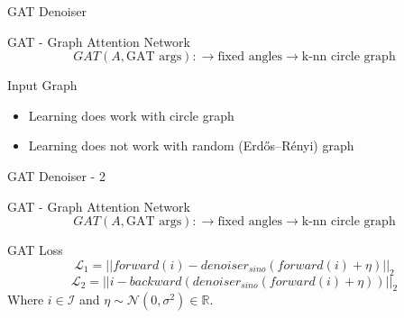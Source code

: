 \documentclass[aspectratio=169]{beamer}
\begin{document}
\begin{frame}{GAT Denoiser}
    \begin{block}{GAT - Graph Attention Network}
        $$ GAT (A, \text{GAT args}) : \to \text{fixed angles} \to \text{k-nn circle graph} $$
    \end{block}    
    
    \pause
    \begin{alertblock}{Input Graph}
        \begin{itemize}
            \item Learning does work with circle graph
            \item Learning does not work with random (Erdős–Rényi) graph
        \end{itemize}
    \end{alertblock}

\end{frame}

\begin{frame}{GAT Denoiser - 2}
    \begin{block}{GAT - Graph Attention Network}
        $$ GAT (A, \text{GAT args}) : \to \text{fixed angles} \to \text{k-nn circle graph} $$
    \end{block}    

    \begin{block}{GAT Loss}
        $$ \mathcal{L}_1 = || forward(i) - denoiser_{sino}(forward(i) + \eta) ||_2 $$ 
        $$ \mathcal{L}_2 = || i - backward (denoiser_{sino}(forward(i) + \eta)) ||_2 $$ 
        \center
        Where $i \in \mathcal{I}$ and $\eta \sim \mathcal{N}(0,\sigma^2) \in \mathbb{R}$.
    \end{block}

\end{frame}
\end{document}
